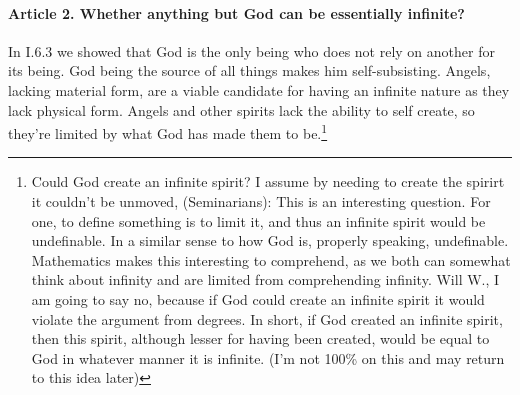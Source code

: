 \documentclass{ucetd}
\begin{document}
\paragraph{Article 2. Whether anything but God can be essentially infinite?}
In I.6.3 we showed that God is the only being who does not rely on another for its being. God being the source of all things makes him self-subsisting. Angels, lacking material form, are a viable candidate for having an infinite nature as they lack physical form. Angels and other spirits lack the ability to self create, so they're limited by what God has made them to be.\footnote{Could God create an infinite spirit? I assume by needing to create the spirirt it couldn't be unmoved, (Seminarians): This is an interesting question. For one, to define something is to limit it, and thus an infinite spirit would be undefinable. In a similar sense to how God is, properly speaking, undefinable. Mathematics makes this interesting to comprehend, as we both can somewhat think about infinity and are limited from comprehending infinity. Will W., I am going to say no, because if God could create an infinite spirit it would violate the argument from degrees. In short, if God created an infinite spirit, then this spirit, although lesser for having been created, would be equal to God in whatever manner it is infinite. (I'm not 100\% on this and may return to this idea later)}
\end{document}
